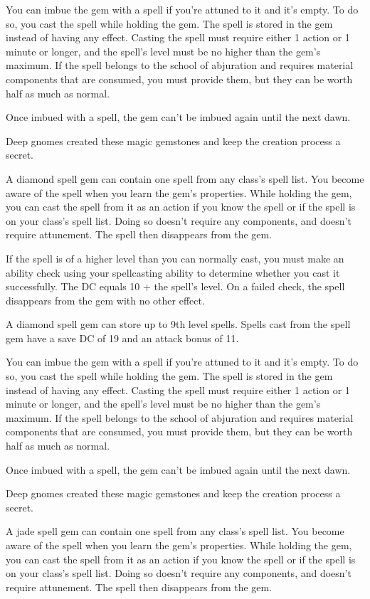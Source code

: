 \documentclass[10pt,a4paper,twoside,bg=print,twocolumn,openany,nodeprecatedcode]{dndbook}
\begin{document}
You can imbue the gem with a spell if you're attuned to it and it's empty. To do so, you cast the spell while holding the gem. The spell is stored in the gem instead of having any effect. Casting the spell must require either 1 action or 1 minute or longer, and the spell's level must be no higher than the gem's maximum. If the spell belongs to the school of abjuration and requires material components that are consumed, you must provide them, but they can be worth half as much as normal.

Once imbued with a spell, the gem can't be imbued again until the next dawn.

Deep gnomes created these magic gemstones and keep the creation process a secret.

A diamond spell gem can contain one spell from any class's spell list. You become aware of the spell when you learn the gem's properties. While holding the gem, you can cast the spell from it as an action if you know the spell or if the spell is on your class's spell list. Doing so doesn't require any components, and doesn't require attunement. The spell then disappears from the gem.

If the spell is of a higher level than you can normally cast, you must make an ability check using your spellcasting ability to determine whether you cast it successfully. The DC equals 10 + the spell's level. On a failed check, the spell disappears from the gem with no other effect.

A diamond spell gem can store up to 9th level spells. Spells cast from the spell gem have a save DC of 19 and an attack bonus of 11.

You can imbue the gem with a spell if you're attuned to it and it's empty. To do so, you cast the spell while holding the gem. The spell is stored in the gem instead of having any effect. Casting the spell must require either 1 action or 1 minute or longer, and the spell's level must be no higher than the gem's maximum. If the spell belongs to the school of abjuration and requires material components that are consumed, you must provide them, but they can be worth half as much as normal.

Once imbued with a spell, the gem can't be imbued again until the next dawn.

Deep gnomes created these magic gemstones and keep the creation process a secret.

A jade spell gem can contain one spell from any class's spell list. You become aware of the spell when you learn the gem's properties. While holding the gem, you can cast the spell from it as an action if you know the spell or if the spell is on your class's spell list. Doing so doesn't require any components, and doesn't require attunement. The spell then disappears from the gem.
\end{document}
